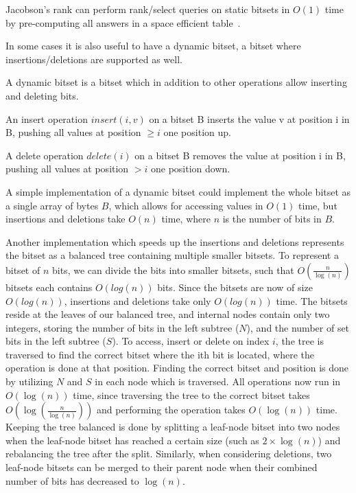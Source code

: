Jacobson's rank can perform rank/select queries on static bitsets in $O(1)$ time by
pre-computing all answers in a space efficient table~\cite{JacobsonsRank}.

In some cases it is also useful to have a dynamic bitset, a bitset where
insertions/deletions are supported as well.

\begin{definition}

    A dynamic bitset is a bitset which in addition to other operations allow inserting and
    deleting bits.

    An insert operation $insert(i, v)$ on a bitset B inserts the value v at position i in
    B, pushing all values at position $\geq i$ one position up.

    A delete operation $delete(i)$ on a bitset B removes the value at position i in B, pushing all
    values at position $> i$ one position down.

\end{definition}

A simple implementation of a dynamic bitset could implement the whole bitset as a single
array of bytes $B$, which allows for accessing values in $O(1)$ time, but insertions and
deletions take $O(n)$ time, where $n$ is the number of bits in $B$.

Another implementation which speeds up the insertions and deletions represents the bitset
as a balanced tree containing multiple smaller bitsets. To represent a bitset of $n$ bits,
we can divide the bits into smaller bitsets, such that $O(\frac{n}{\log(n)})$ bitsets each
contains $O(log(n))$ bits. Since the bitsets are now of size $O(log(n))$, insertions and
deletions take only $O(log(n))$ time. The bitsets reside at the leaves of our balanced
tree, and internal nodes contain only two integers, storing the number of bits in the left
subtree ($N$), and the number of set bits in the left subtree ($S$). To access, insert or
delete on index $i$, the tree is traversed to find the correct bitset where the ith bit is
located, where the operation is done at that position. Finding the correct bitset and
position is done by utilizing $N$ and $S$ in each node which is traversed. All operations
now run in $O(\log(n))$ time, since traversing the tree to the correct bitset takes
$O(\log(\frac{n}{\log(n)}))$ and performing the operation takes $O(\log(n))$ time. Keeping
the tree balanced is done by splitting a leaf-node bitset into two nodes when the
leaf-node bitset has reached a certain size (such as $2 \times \log(n)$) and rebalancing
the tree after the split. Similarly, when considering deletions, two leaf-node bitsets can
be merged to their parent node when their combined number of bits has decreased to
$\log(n)$.

